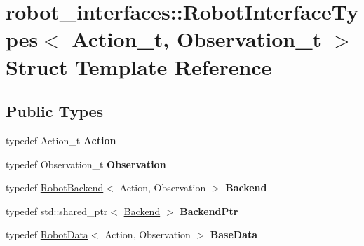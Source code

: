 \hypertarget{structrobot__interfaces_1_1RobotInterfaceTypes}{}\section{robot\+\_\+interfaces\+:\+:Robot\+Interface\+Types$<$ Action\+\_\+t, Observation\+\_\+t $>$ Struct Template Reference}
\label{structrobot__interfaces_1_1RobotInterfaceTypes}
\subsection*{Public Types}
\begin{DoxyCompactItemize}
\item 
\mbox{\label{structrobot__interfaces_1_1RobotInterfaceTypes_ac2a0093d66c4d68bc4578933f8d83fc1}} 
typedef Action\+\_\+t {\bfseries Action}
\item 
\mbox{\label{structrobot__interfaces_1_1RobotInterfaceTypes_aa1335745a48bcaff7d9ebdccecad834d}} 
typedef Observation\+\_\+t {\bfseries Observation}
\item 
\mbox{\label{structrobot__interfaces_1_1RobotInterfaceTypes_addd1356450d6d2d2541538bae3b51ab3}} 
typedef \hyperlink{classrobot__interfaces_1_1RobotBackend}{Robot\+Backend}$<$ Action, Observation $>$ {\bfseries Backend}
\item 
\mbox{\label{structrobot__interfaces_1_1RobotInterfaceTypes_a7fff6d1a6d0ae001e58d66900d236eee}} 
typedef std\+::shared\+\_\+ptr$<$ \hyperlink{classrobot__interfaces_1_1RobotBackend}{Backend} $>$ {\bfseries Backend\+Ptr}
\item 
\mbox{\label{structrobot__interfaces_1_1RobotInterfaceTypes_a883af634dc6f7ce7ba4cc012f81c70f9}} 
typedef \hyperlink{classrobot__interfaces_1_1RobotData}{Robot\+Data}$<$ Action, Observation $>$ {\bfseries Base\+Data}
\item 
\mbox{\label{structrobot__interfaces_1_1RobotInterfaceTypes_ad227868c65620fff06f74eb79b1a52ea}} 

\end{DoxyCompactItemize}
